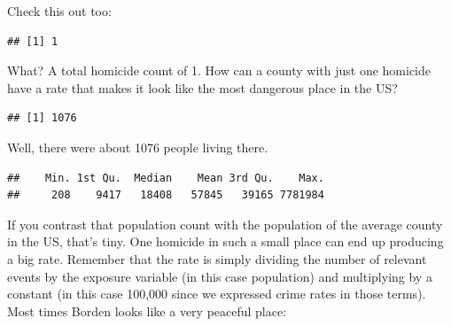 \documentclass[
]{book}
\newenvironment{Shaded}{\begin{snugshade}}{\end{snugshade}}
\newcommand{\FunctionTok}[1]{\textcolor[rgb]{0.00,0.00,0.00}{#1}}
\newcommand{\NormalTok}[1]{#1}
\newcommand{\SpecialCharTok}[1]{\textcolor[rgb]{0.00,0.00,0.00}{#1}}
\begin{document}
Check this out too:

\begin{Shaded}
\end{Shaded}

\begin{verbatim}
## [1] 1
\end{verbatim}

What? A total homicide count of 1. How can a county with just one homicide have a rate that makes it look like the most dangerous place in the US?

\begin{Shaded}
\end{Shaded}

\begin{verbatim}
## [1] 1076
\end{verbatim}

Well, there were about 1076 people living there.

\begin{Shaded}
\end{Shaded}

\begin{verbatim}
##    Min. 1st Qu.  Median    Mean 3rd Qu.    Max. 
##     208    9417   18408   57845   39165 7781984
\end{verbatim}

If you contrast that population count with the population of the average county in the US, that's tiny. One homicide in such a small place can end up producing a big rate. Remember that the rate is simply dividing the number of relevant events by the exposure variable (in this case population) and multiplying by a constant (in this case 100,000 since we expressed crime rates in those terms). Most times Borden looks like a very peaceful place:

\begin{Shaded}
\end{Shaded}
\end{document}
